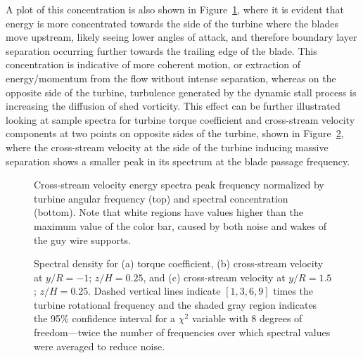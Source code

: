 A plot of this concentration is also shown in Figure~\ref{fig-fcont}, where it
is evident that energy is more concentrated towards the side of the  turbine
where the blades move upstream, likely seeing lower angles of attack, and
therefore boundary layer separation occurring further towards the trailing edge
of the blade. This concentration is indicative of more coherent motion, or
extraction of energy/momentum from the flow without intense separation, whereas
on the opposite side of the turbine, turbulence generated by the dynamic stall
process is increasing the diffusion of shed vorticity. This effect can be
further illustrated looking at sample spectra for turbine torque coefficient and
cross-stream velocity components at two points on opposite sides of the turbine,
shown in Figure~\ref{fig-multispec}, where the cross-stream velocity at the side
of the turbine inducing massive separation shows a smaller peak in its spectrum
at the blade passage frequency.

\begin{figure}[h]
    \centering
    

    \caption{Cross-stream velocity energy spectra peak frequency normalized by
        turbine angular frequency (top) and spectral concentration (bottom). Note
        that white regions have values higher than the maximum value of the color
        bar, caused by both noise and wakes of the guy wire supports.}
    
    \label{fig-fcont}
\end{figure}

\begin{figure}[h]
    \centering


    \caption{Spectral density for (a) torque coefficient, (b) cross-stream
        velocity at $y/R = -1$; $z/H = 0.25$, and (c) cross-stream velocity at $y/R
        = 1.5$; $z/H = 0.25$. Dashed vertical lines indicate $[1, 3, 6, 9]$ times
        the turbine rotational frequency and the shaded gray region indicates the
        95\% confidence interval for a $\chi^2$ variable with 8 degrees of
        freedom---twice the number of frequencies over which spectral values were
        averaged to reduce noise.}
    
    \label{fig-multispec}
\end{figure}


